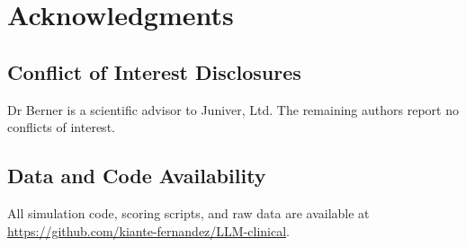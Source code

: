 \documentclass[10pt]{article}
\begin{document}
\section*{Acknowledgments}

\subsection*{Conflict of Interest Disclosures}
Dr Berner is a scientific advisor to Juniver, Ltd. The remaining authors report no conflicts of interest.

\subsection*{Data and Code Availability}

All simulation code, scoring scripts, and raw data are available at \url{https://github.com/kiante-fernandez/LLM-clinical}.


\end{document}
